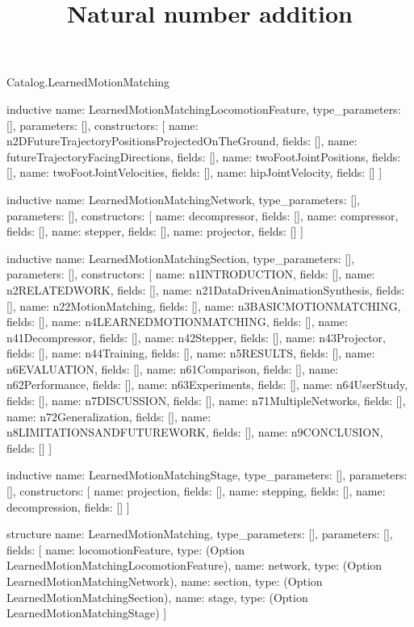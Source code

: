 \begin{lexlean}{Catalog.LearnedMotionMatching}
\title{Natural number addition}
\begin{semanticmodule}
inductive{
  name: LearnedMotionMatchingLocomotionFeature,
  type_parameters: [],
  parameters: [],
  constructors: [
    {name: n2DFutureTrajectoryPositionsProjectedOnTheGround, fields: []},
    {name: futureTrajectoryFacingDirections, fields: []},
    {name: twoFootJointPositions, fields: []},
    {name: twoFootJointVelocities, fields: []},
    {name: hipJointVelocity, fields: []}
  ]
}

inductive{
  name: LearnedMotionMatchingNetwork,
  type_parameters: [],
  parameters: [],
  constructors: [
    {name: decompressor, fields: []},
    {name: compressor, fields: []},
    {name: stepper, fields: []},
    {name: projector, fields: []}
  ]
}

inductive{
  name: LearnedMotionMatchingSection,
  type_parameters: [],
  parameters: [],
  constructors: [
    {name: n1INTRODUCTION, fields: []},
    {name: n2RELATEDWORK, fields: []},
    {name: n21DataDrivenAnimationSynthesis, fields: []},
    {name: n22MotionMatching, fields: []},
    {name: n3BASICMOTIONMATCHING, fields: []},
    {name: n4LEARNEDMOTIONMATCHING, fields: []},
    {name: n41Decompressor, fields: []},
    {name: n42Stepper, fields: []},
    {name: n43Projector, fields: []},
    {name: n44Training, fields: []},
    {name: n5RESULTS, fields: []},
    {name: n6EVALUATION, fields: []},
    {name: n61Comparison, fields: []},
    {name: n62Performance, fields: []},
    {name: n63Experiments, fields: []},
    {name: n64UserStudy, fields: []},
    {name: n7DISCUSSION, fields: []},
    {name: n71MultipleNetworks, fields: []},
    {name: n72Generalization, fields: []},
    {name: n8LIMITATIONSANDFUTUREWORK, fields: []},
    {name: n9CONCLUSION, fields: []}
  ]
}

inductive{
  name: LearnedMotionMatchingStage,
  type_parameters: [],
  parameters: [],
  constructors: [
    {name: projection, fields: []},
    {name: stepping, fields: []},
    {name: decompression, fields: []}
  ]
}

structure{
  name: LearnedMotionMatching,
  type_parameters: [],
  parameters: [],
  fields: [
    {name: locomotionFeature, type: (Option LearnedMotionMatchingLocomotionFeature)},
    {name: network, type: (Option LearnedMotionMatchingNetwork)},
    {name: section, type: (Option LearnedMotionMatchingSection)},
    {name: stage, type: (Option LearnedMotionMatchingStage)}
  ]
}
\end{semanticmodule}
\end{lexlean}
